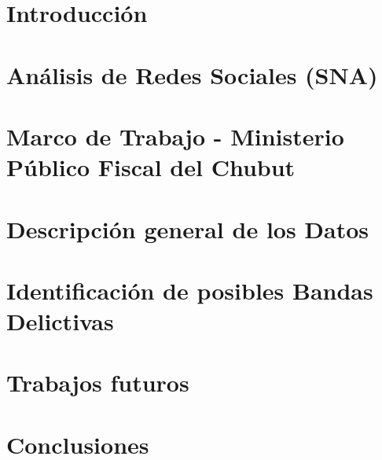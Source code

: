 \documentclass[runningheads]{llncs}
\begin{document}
%

\maketitle              %


%

%
\section{Introducción}


\section{Análisis de Redes Sociales (SNA)}


\section{Marco de Trabajo - Ministerio Público Fiscal del Chubut}


\section{Descripción general de los Datos}


\section{Identificación de posibles Bandas Delictivas}


\section{Trabajos futuros}


\section{Conclusiones}

\end{document}
